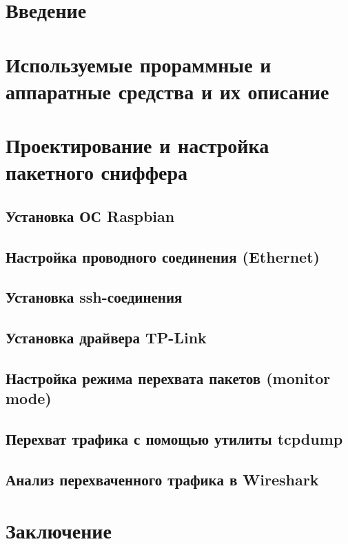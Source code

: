 






\newpage
{}
\tableofcontents

\newpage
{}
\setcounter{section}{0}
\section*{Введение}


\newpage
{}
\section{Используемые прораммные и аппаратные средства и их описание}
\setcounter{figure}{0}


\newpage
{}
\section{Проектирование и настройка пакетного сниффера}
\setcounter{figure}{0}
\subsection{Установка ОС Raspbian}

\subsection{Настройка проводного соединения (Ethernet)}

\subsection{Установка ssh-соединения}

\subsection{Установка драйвера TP-Link}

\subsection{Настройка режима перехвата пакетов (monitor mode)}

\subsection{Перехват трафика с помощью утилиты tcpdump}

\subsection{Анализ перехваченного трафика в Wireshark}


\newpage
{}
\setcounter{section}{0}
\section*{Заключение}



\clearpage
\renewcommand{\refname}{Список использованных источников}



